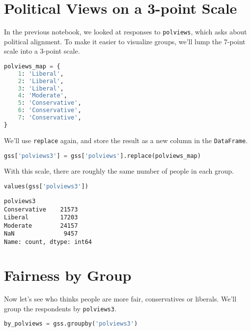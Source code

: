 \section{Political Views on a 3-point
Scale}\label{political-views-on-a-3-point-scale}

In the previous notebook, we looked at responses to
\passthrough{\lstinline!polviews!}, which asks about political
alignment. To make it easier to visualize groups, we'll lump the 7-point
scale into a 3-point scale.

\begin{lstlisting}[language=Python,style=source]
polviews_map = {
    1: 'Liberal',
    2: 'Liberal',
    3: 'Liberal',
    4: 'Moderate',
    5: 'Conservative',
    6: 'Conservative',
    7: 'Conservative',
}
\end{lstlisting}

We'll use \passthrough{\lstinline!replace!} again, and store the result
as a new column in the \passthrough{\lstinline!DataFrame!}.

\begin{lstlisting}[language=Python,style=source]
gss['polviews3'] = gss['polviews'].replace(polviews_map)
\end{lstlisting}

With this scale, there are roughly the same number of people in each
group.

\begin{lstlisting}[language=Python,style=source]
values(gss['polviews3'])
\end{lstlisting}

\begin{lstlisting}[style=output]
polviews3
Conservative    21573
Liberal         17203
Moderate        24157
NaN              9457
Name: count, dtype: int64
\end{lstlisting}

\section{Fairness by Group}\label{fairness-by-group}

Now let's see who thinks people are more fair, conservatives or
liberals. We'll group the respondents by
\passthrough{\lstinline!polviews3!}.

\begin{lstlisting}[language=Python,style=source]
by_polviews = gss.groupby('polviews3')
\end{lstlisting}

\pagebreak

